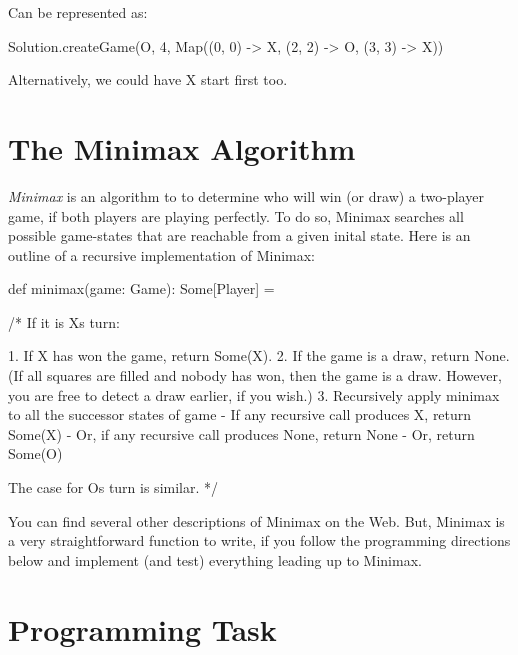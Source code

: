 \documentclass{book}
\begin{document}
\begin{itemize}

Can be represented as:
\begin{scalacode}
Solution.createGame(O, 4, Map((0, 0) -> X, (2, 2) -> O, (3, 3) -> X))
\end{scalacode}
Alternatively, we could have X start first too.

\end{itemize}

\section{The Minimax Algorithm}

\emph{Minimax} is an algorithm to to determine who will win (or draw)
a two-player game, if both players are playing perfectly. To do so, Minimax
searches all possible game-states that are reachable from a given inital
state. Here is an outline of a recursive implementation of Minimax:

\begin{scalacode}
def minimax(game: Game): Some[Player] = {

  /*
  If it is Xs turn:

    1. If X has won the game, return Some(X).
    2. If the game is a draw, return None. (If all squares are filled
       and nobody has won, then the game is a draw. However, you are
       free to detect a draw earlier, if you wish.)
    3. Recursively apply minimax to all the successor states of game
       - If any recursive call produces X, return Some(X)
       - Or, if any recursive call produces None, return None
       - Or, return Some(O)

  The case for Os turn is similar.
  */

}
\end{scalacode}

You can find several other descriptions of Minimax on the Web. But, Minimax
 is a very straightforward function to write, if you follow the programming directions below
and implement (and test) everything leading up to Minimax.

\section{Programming Task}
\end{document}
